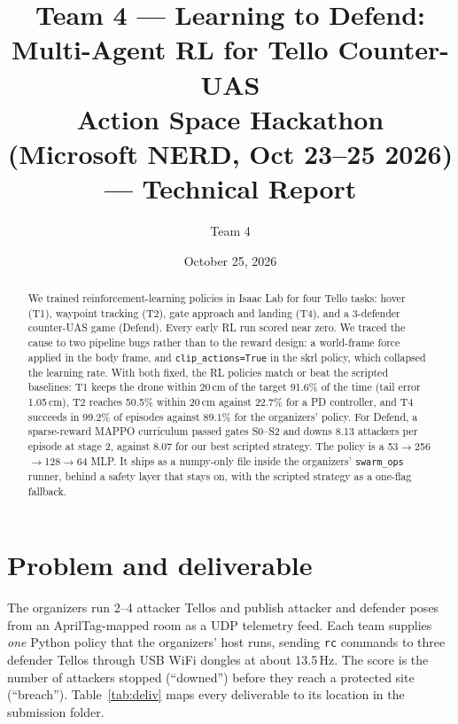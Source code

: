 \documentclass[10pt,a4paper]{article}
\title{\textbf{Team 4 --- Learning to Defend: Multi-Agent RL for Tello Counter-UAS}\\[2pt]
\large Action Space Hackathon (Microsoft NERD, Oct 23--25 2026) --- Technical Report}
\author{Team 4}
\date{October 25, 2026}
\begin{document}
\maketitle

\begin{abstract}
We trained reinforcement-learning policies in Isaac Lab for four Tello tasks: hover (T1), waypoint tracking (T2),
gate approach and landing (T4), and a 3-defender counter-UAS game (Defend). Every early RL run scored
near zero. We traced the cause to two pipeline bugs rather than to the reward design: a world-frame force
applied in the body frame, and \texttt{clip\_actions=True} in the skrl policy, which collapsed the learning rate.
With both fixed, the RL policies match or beat the scripted baselines:
T1 keeps the drone within 20\,cm of the target 91.6\% of the time (tail error 1.05\,cm),
T2 reaches 50.5\% within 20\,cm against 22.7\% for a PD controller, and T4 succeeds in 99.2\% of episodes against 89.1\% for the
organizers' policy. For Defend, a sparse-reward MAPPO curriculum passed gates S0--S2 and downs
8.13 attackers per episode at stage 2, against 8.07 for our best scripted strategy. The policy is a 53$\to$256$\to$128$\to$64 MLP.
It ships as a numpy-only file inside the organizers' \texttt{swarm\_ops} runner, behind a safety layer that stays on,
with the scripted strategy as a one-flag fallback.
\end{abstract}

\section{Problem and deliverable}
The organizers run 2--4 attacker Tellos and publish attacker and defender poses from an AprilTag-mapped room as a
UDP telemetry feed. Each team supplies \emph{one} Python policy that the organizers' host runs, sending \texttt{rc}
commands to three defender Tellos through USB WiFi dongles at about 13.5\,Hz.
The score is the number of attackers stopped (``downed'') before they reach a protected site (``breach'').
Table~\ref{tab:deliv} maps every deliverable to its location in the submission folder.
\end{document}
